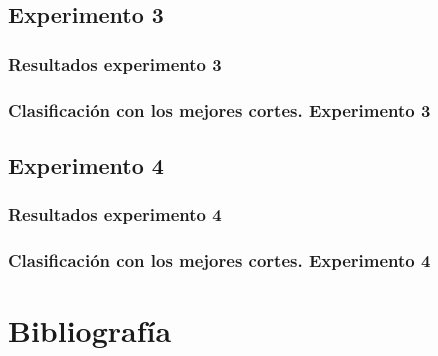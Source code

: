 

\subsection{Experimento 3}



\subsubsection{Resultados experimento 3}



\subsubsection{Clasificación con los mejores cortes. Experimento 3}



\subsection{Experimento 4}



\subsubsection{Resultados experimento 4}



\subsubsection{Clasificación con los mejores cortes. Experimento 4}



\newpage
\section{Bibliografía}







\appendix
\clearpage
\addappheadtotoc
\appendixpage



 


